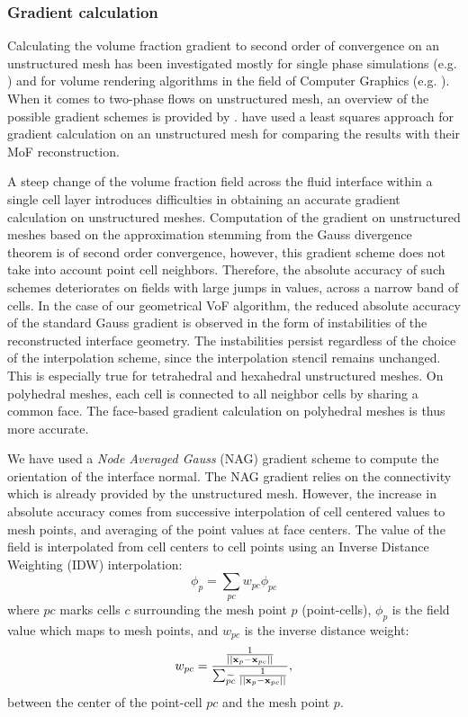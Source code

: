 \subsubsection{Gradient calculation}

Calculating the volume fraction gradient to second order of convergence on an
unstructured mesh has been investigated mostly for single phase simulations
(e.g. \citet{lsq-revisiting}) and for volume rendering algorithms in the field
of Computer Graphics (e.g. \citet{IEEE-gradComparison}). When it comes to two-phase 
flows on unstructured mesh, an overview of the possible gradient schemes
is provided by \citet{KotheUnstructured1996}.
\citet{AhnShashkovMultiMaterialRec2007} have used a least squares approach for
gradient calculation on an unstructured mesh for comparing the results with
their MoF reconstruction. 

A steep change of the volume fraction field across the fluid interface within a
single cell layer introduces difficulties in obtaining an accurate gradient
calculation on unstructured meshes. Computation of the gradient on unstructured
meshes based on the approximation stemming from the Gauss divergence theorem is
of second order convergence, however, this gradient scheme does not take into
account point cell neighbors. Therefore, the absolute accuracy of such schemes
deteriorates on fields with large jumps in values, across a narrow band of
cells. In the case of our geometrical VoF algorithm, the reduced absolute
accuracy of the standard Gauss gradient is observed in the form of
instabilities of the reconstructed interface geometry. The instabilities
persist regardless of the choice of the interpolation scheme, since the
interpolation stencil remains unchanged. This is especially true for
tetrahedral and hexahedral unstructured meshes. On polyhedral meshes, each cell
is connected to all neighbor cells by sharing a common face. The face-based
gradient calculation on polyhedral meshes is thus more accurate.

We have used a \emph{Node Averaged Gauss} (NAG) gradient scheme to compute the
orientation of the interface normal. The NAG gradient relies on the
connectivity which is already provided by the unstructured mesh. However, the
increase in absolute accuracy comes from successive interpolation of cell
centered values to mesh points, and averaging of the point values at face
centers. The value of the field is interpolated from cell centers to cell
points using an Inverse Distance Weighting (IDW) interpolation:
%
\begin{equation}
    \phi_p = \sum_{pc} w_{pc} \phi_{pc}
    \label{eq:idwpointphi}
\end{equation}
%
where $pc$ marks cells $c$ surrounding the mesh point $p$ (point-cells), 
$\phi_p$ is the field value which maps to mesh points, and $w_{pc}$ is the
inverse distance weight:
%
\begin{equation}
    w_{pc} = \frac{\frac{1}{||\mathbf x_p - \mathbf x_{pc}||}}{\sum_{\widetilde{pc}} \frac{1}{||\mathbf x_p - \mathbf x_{pc}||}},
\end{equation}
%
between the center of the point-cell $pc$ and the mesh point $p$. 

